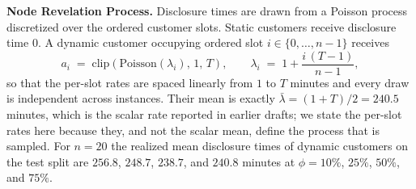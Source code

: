 


\textbf{Node Revelation Process.} Disclosure times are drawn from a Poisson
process discretized over the ordered customer slots. Static customers receive
disclosure time $0$. A dynamic customer occupying ordered slot
$i \in \{0,\ldots,n-1\}$ receives
\begin{equation}
a_i \;=\; \mathrm{clip}\!\left(\mathrm{Poisson}(\lambda_i),\, 1,\, T\right),
\qquad
\lambda_i \;=\; 1 + \frac{i\,(T-1)}{n-1},
\label{eq:disclosure}
\end{equation}
so that the per-slot rates are spaced linearly from $1$ to $T$ minutes and every
draw is independent across instances. Their mean is exactly
$\bar{\lambda} = (1+T)/2 = 240.5$ minutes, which is the scalar rate reported in
earlier drafts; we state the per-slot rates here because they, and not the
scalar mean, define the process that is sampled. For $n=20$ the realized mean
disclosure times of dynamic customers on the test split are $256.8$, $248.7$,
$238.7$, and $240.8$ minutes at $\phi = 10\%$, $25\%$, $50\%$, and $75\%$.


